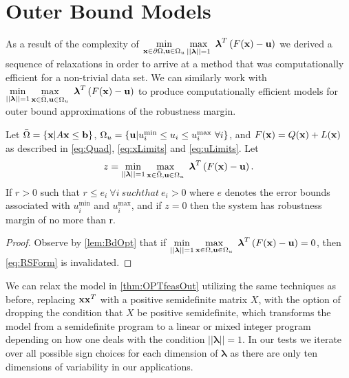 \section{Outer Bound Models} \label{sec:outbdform}  

As a result of the complexity of $\displaystyle \min\limits_{\vx\in \partial \Omega, \vu\in\Omega_u}\max\limits_{||\boldsymbol{\lambda}||=1 }\ \boldsymbol{\lambda}^T\left(F(\vx)-\vu\right)$ we derived a sequence of relaxations in order to arrive at a method that was computationally efficient for a non-trivial data set. 
We can similarly work with $\displaystyle \min\limits_{||\boldsymbol{\lambda}||=1}\max\limits_{\vx\in \bar{\Omega}, \vu\in\Omega_u}\ \boldsymbol{\lambda}^T\left(F(\vx)-\vu\right)$ to produce computationally efficient models for outer bound approximations of the robustness margin. 
\begin{thm}\label{thm:OPTfeasOut} 
Let $\bar{\Omega}=\{\mathbf{x}| A\mathbf{x}\leq \mathbf{b}\}$, $\Omega_{u}=\{\mathbf{u}| u^{\min}_i\leq u_i \leq u^{\max}_i \ \forall i \}$, and $F(\mathbf{x})=Q(\mathbf{x})+L(\mathbf{x})$ as described in \eqref{eq:Quad}, \eqref{eq:xLimits} and \eqref{eq:uLimits}. 
Let
$$z = \min\limits_{||\boldsymbol{\lambda}||=1}\max\limits_{\vx\in \bar{\Omega}, \vu\in\Omega_u}\ \boldsymbol{\lambda}^T\left(F(\vx)-\vu\right).$$
If $r>0$ such that $r\leq e_i \ \forall i \ such that \ e_i>0$ where $e$ denotes the error bounds associated with $ u^{\min}_i$ and $ u^{\max}_i$, and if $z=0$ then the system has robustness margin of no more than r.

\begin{proof} 
  Observe by \cref{lem:BdOpt} that if $\min\limits_{||\boldsymbol{\lambda}||=1}\max\limits_{\vx\in \Omega, \vu\in\Omega_u}\ \boldsymbol{\lambda}^T\left(F(\vx)-\vu\right)=0$, then \eqref{eq:RSForm} is invalidated.  

\end{proof}
\end{thm}

We can relax the model in \cref{thm:OPTfeasOut} utilizing the same techniques as before, replacing $\mathbf{x}\mathbf{x}^T$ with a positive semidefinite matrix $X$, with the option of dropping the condition that $X$ be positive semidefinite, which transforms the model from a semidefinite program to a linear or mixed integer program depending on how one deals with the condition $||\boldsymbol{\lambda}||=1$. 
In our tests we iterate over all possible sign choices for each dimension of $\boldsymbol{\lambda}$ as there are only ten dimensions of variability in our applications. 


